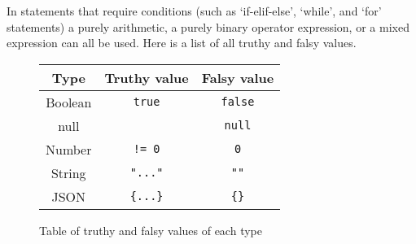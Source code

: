 \documentclass[12pt, letterpaper]{article}
\begin{document}
In statements that require conditions (such as `if-elif-else', `while', and `for' statements) a purely arithmetic, a purely binary operator expression, or a mixed expression can all be used. Here is a list of all truthy and falsy values.

\begin{figure}[H]
    \begin{center}
        \begin{tabular}{| c | c | c |}
            \hline
            Type & Truthy value & Falsy value\\
            \hline
            Boolean & \verb|true| & \verb|false|\\
            \hline
            null & & \verb|null|\\
            \hline
            Number & \verb|!= 0| & \verb|0|\\
            \hline
            String & \verb|"..."| & \verb|""|\\
            \hline
            JSON & \verb|{...}| & \verb|{}|\\
            \hline
        \end{tabular}
    \end{center}
    \caption{Table of truthy and falsy values of each type}
\end{figure}
\end{document}
